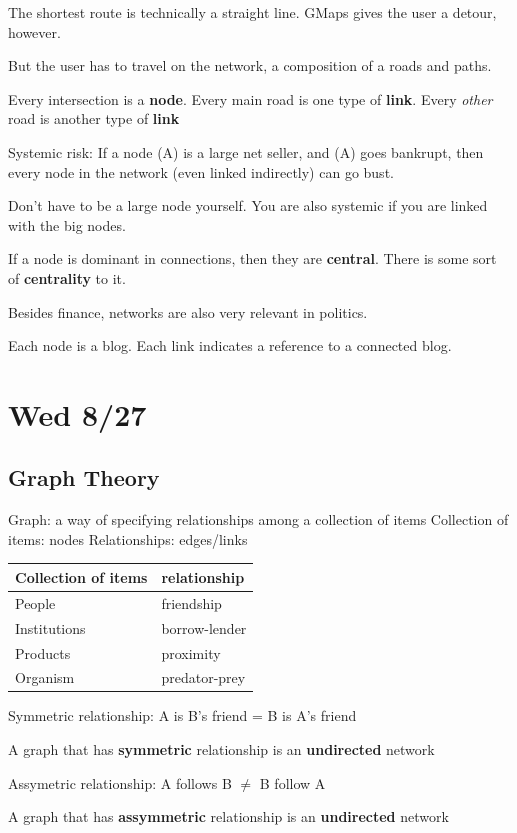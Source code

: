 \documentclass[14pt, letterpaper, oneside]{extarticle}
\begin{document}
The shortest route is technically a straight line. GMaps gives the user a detour, however.

But the user has to travel on the network, a composition of a roads and paths.

Every intersection is a \textbf{node}. Every main road is one type of \textbf{link}. Every \textit{other} road is another type of \textbf{link}

Systemic risk:
If a node (A) is a large net seller, and (A) goes bankrupt, then every node in the network (even linked indirectly) can go bust.

Don't have to be a large node yourself. You are also systemic if you are linked with the big nodes.

If a node is dominant in connections, then they are \textbf{central}. There is some sort of \textbf{centrality} to it.

Besides finance, networks are also very relevant in politics.

Each node is a blog. Each link indicates a reference to a connected blog.

\section{Wed 8/27}
\subsection{Graph Theory}
Graph: a way of specifying relationships among a collection of items
Collection of items: nodes
Relationships: edges/links

\begin{tabularx}{\textwidth}{Y|Y}
    Collection of items & relationship \\
    \hline
    People & friendship \\
    Institutions & borrow-lender \\
    Products & proximity \\
    Organism & predator-prey
\end{tabularx}

Symmetric relationship:
A is B's friend = B is A's friend

A graph that has \textbf{symmetric} relationship is an \textbf{undirected} network

Assymetric relationship: A follows B $\neq$ B follow A

A graph that has \textbf{assymmetric} relationship is an \textbf{undirected} network
\end{document}
